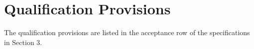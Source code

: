 
\chapter{Qualification Provisions}

The qualification provisions are listed in the acceptance row of the specifications in Section 3.

